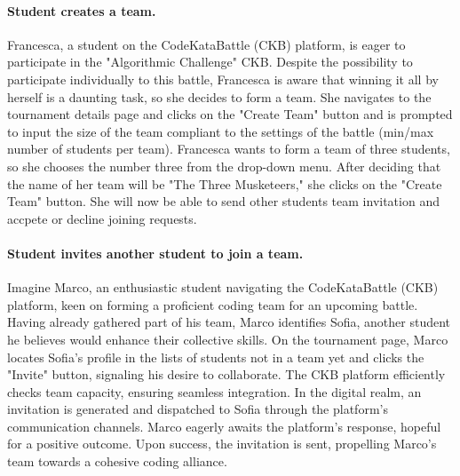 \paragraph*{Student creates a team.}
Francesca, a student on the CodeKataBattle (CKB) platform, is eager to participate in the "Algorithmic Challenge" CKB.
Despite the possibility to participate individually to this battle, 
Francesca is aware that winning it all by herself is a daunting task, so she decides to form a team.
She navigates to the tournament details page and clicks on the "Create Team" button and is prompted to input the size of the team compliant to the settings of the battle (min/max number of students per team).
Francesca wants to form a team of three students, so she chooses the number three from the drop-down menu.
After deciding that the name of her team will be "The Three Musketeers," she clicks on the "Create Team" button.
She will now be able to send other students team invitation and accpete or decline joining requests.


\paragraph*{Student invites another student to join a team.}
Imagine Marco, an enthusiastic student navigating the CodeKataBattle (CKB) platform, keen on forming a proficient coding team for an upcoming battle. 
Having already gathered part of his team, Marco identifies Sofia, another student he believes would enhance their collective skills.
On the tournament page, Marco locates Sofia's profile in the lists of students not in a team yet and clicks the "Invite" button, signaling his desire to collaborate. 
The CKB platform efficiently checks team capacity, ensuring seamless integration.
In the digital realm, an invitation is generated and dispatched to Sofia through the platform's communication channels. 
Marco eagerly awaits the platform's response, hopeful for a positive outcome.
Upon success, the invitation is sent, propelling Marco's team towards a cohesive coding alliance.



